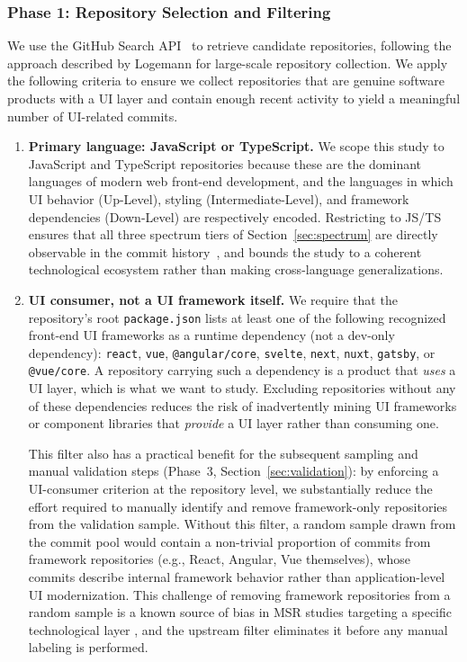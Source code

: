 \documentclass{article}
\begin{document}
\subsubsection{Phase 1: Repository Selection and Filtering}

We use the GitHub Search API~\cite{github2024} to retrieve candidate
repositories, following the approach described by Logemann
\cite{logemann2024file} for large-scale repository collection. We apply
the following criteria to ensure we collect repositories that are genuine
software products with a UI layer and contain enough recent activity to
yield a meaningful number of UI-related commits.

\begin{enumerate}
    \item \textbf{Primary language: JavaScript or TypeScript.}
    We scope this study to JavaScript and TypeScript repositories because
    these are the dominant languages of modern web front-end development,
    and the languages in which UI behavior (Up-Level), styling
    (Intermediate-Level), and framework dependencies (Down-Level) are
    respectively encoded. Restricting to JS/TS ensures that all three
    spectrum tiers of Section~\ref{sec:spectrum} are directly observable
    in the commit history~\cite{lamine2022understanding}, and bounds the
    study to a coherent technological ecosystem rather than making
    cross-language generalizations.

    \item \textbf{UI consumer, not a UI framework itself.}
    We require that the repository's root \texttt{package.json} lists at
    least one of the following recognized front-end UI frameworks as a
    runtime dependency (not a dev-only dependency): \texttt{react},
    \texttt{vue}, \texttt{@angular/core}, \texttt{svelte}, \texttt{next},
    \texttt{nuxt}, \texttt{gatsby}, or \texttt{@vue/core}. A repository
    carrying such a dependency is a product that \emph{uses} a UI layer,
    which is what we want to study. Excluding repositories without any of
    these dependencies reduces the risk of inadvertently mining UI
    frameworks or component libraries that \emph{provide} a UI layer
    rather than consuming one.

    This filter also has a practical benefit for the subsequent sampling
    and manual validation steps (Phase~3, Section~\ref{sec:validation}):
    by enforcing a UI-consumer criterion at the repository level, we
    substantially reduce the effort required to manually identify and
    remove framework-only repositories from the validation sample.
    Without this filter, a random sample drawn from the commit pool would
    contain a non-trivial proportion of commits from framework repositories
    (e.g., React, Angular, Vue themselves), whose commits describe internal
    framework behavior rather than application-level UI modernization.
    This challenge of removing framework repositories from a random sample
    is a known source of bias in MSR studies targeting a specific
    technological layer \cite{kalliamvakou2014promises}, and the upstream
    filter eliminates it before any manual labeling is performed.


\end{enumerate}
\end{document}
